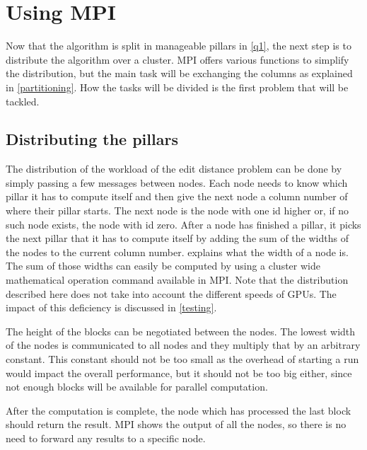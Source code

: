 \section{Using MPI} \label{q2}
Now that the algorithm is split in manageable pillars in \cref{q1}, the next step is to distribute the algorithm over a cluster.
MPI offers various functions to simplify the distribution, but the main task will be exchanging the columns as explained in \cref{partitioning}.
How the tasks will be divided is the first problem that will be tackled.

\subsection{Distributing the pillars}
The distribution of the workload of the edit distance problem can be done by simply passing a few messages between nodes.
Each node needs to know which pillar it has to compute itself and then give the next node a column number of where their pillar starts.
The next node is the node with one id higher or, if no such node exists, the node with id zero.
After a node has finished a pillar, it picks the next pillar that it has to compute itself by adding the sum of the widths of the nodes to the current column number.
 explains what the width of a node is.
The sum of those widths can easily be computed by using a cluster wide mathematical operation command available in MPI.
Note that the distribution described here does not take into account the different speeds of GPUs.
The impact of this deficiency is discussed in \cref{testing}.

The height of the blocks can be negotiated between the nodes.
The lowest width of the nodes is communicated to all nodes and they multiply that by an arbitrary constant.
This constant should not be too small as the overhead of starting a run would impact the overall performance, but it should not be too big either, since not enough blocks will be available for parallel computation.

After the computation is complete, the node which has processed the last block should return the result.
MPI shows the output of all the nodes, so there is no need to forward any results to a specific node.

